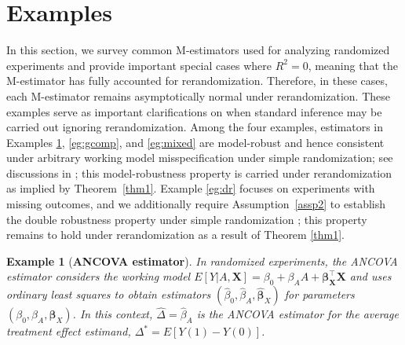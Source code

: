 \documentclass[12pt]{article}
\newtheorem{example}{Example}
\newcommand{\bX}{\boldsymbol{X}}\newcommand{\bO}{\boldsymbol{O}}
\newcommand{\bbeta}{\boldsymbol{\beta}}
\begin{document}
\section{Examples}\label{sec:examples}
In this section, we survey common M-estimators used for analyzing randomized experiments and provide important special cases where $R^2=0$, meaning that the M-estimator has fully accounted for rerandomization. 
Therefore, in these cases, each M-estimator remains asymptotically normal under rerandomization.
These examples serve as important clarifications on when standard inference may be carried out ignoring rerandomization. Among the four examples, estimators in Examples \ref{eg:ancova}, \ref{eg:gcomp}, and \ref{eg:mixed} are model-robust and hence consistent under arbitrary working model misspecification under simple randomization; see discussions in \citet{Tsiatis2008, colantuoni2015leveraging, wang2021mixed}; this model-robustness property is carried under rerandomization as implied by Theorem~\ref{thm1}. Example \ref{eg:dr} focuses on experiments with missing outcomes, and we additionally require Assumption~\ref{assp2} to establish the double robustness property under simple randomization \citep{robins2007}; this property remains to hold under rerandomization as a result of Theorem \ref{thm1}. 

\begin{example}[\textbf{ANCOVA estimator}]\label{eg:ancova}
In randomized experiments, the ANCOVA estimator considers the working model $E[Y|A,\bX] = \beta_0 + \beta_AA + \bbeta_{\bX}^\top \bX$ and uses ordinary least squares to obtain estimators $(\widehat\beta_0, \widehat\beta_A, \widehat{\bbeta}_X)$ for parameters $(\beta_0, \beta_A, \bbeta_X)$. In this context, $\widehat{\Delta}=\widehat\beta_A$ is the ANCOVA estimator for the average treatment effect estimand, $\Delta^* = E[Y(1)-Y(0)]$. 
\end{example}
\end{document}
